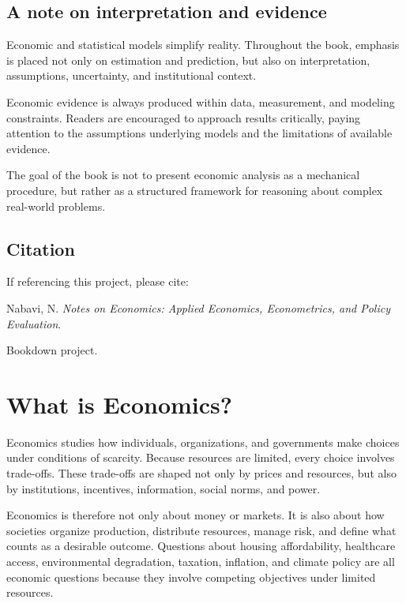 \documentclass[
  11pt,
  oneside]{book}
\begin{document}
\section{A note on interpretation and evidence}\label{a-note-on-interpretation-and-evidence}

Economic and statistical models simplify reality. Throughout the book, emphasis is placed not only on estimation and prediction, but also on interpretation, assumptions, uncertainty, and institutional context.

Economic evidence is always produced within data, measurement, and modeling constraints. Readers are encouraged to approach results critically, paying attention to the assumptions underlying models and the limitations of available evidence.

The goal of the book is not to present economic analysis as a mechanical procedure, but rather as a structured framework for reasoning about complex real-world problems.

\section{Citation}\label{citation}

If referencing this project, please cite:

Nabavi, N. \emph{Notes on Economics: Applied Economics, Econometrics, and Policy Evaluation}.

Bookdown project. \href{https://doi.org/10.5281/zenodo.20737021}{}

\chapter{What is Economics?}\label{what-is-econ}

Economics studies how individuals, organizations, and governments make choices under conditions of scarcity. Because resources are limited, every choice involves trade-offs. These trade-offs are shaped not only by prices and resources, but also by institutions, incentives, information, social norms, and power.

Economics is therefore not only about money or markets. It is also about how societies organize production, distribute resources, manage risk, and define what counts as a desirable outcome. Questions about housing affordability, healthcare access, environmental degradation, taxation, inflation, and climate policy are all economic questions because they involve competing objectives under limited resources.
\end{document}
